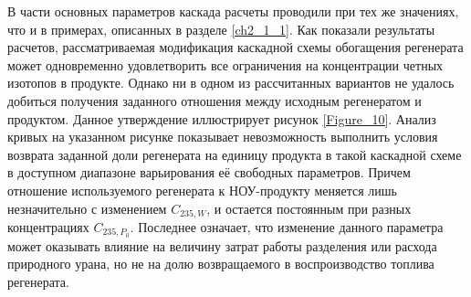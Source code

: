 В части основных параметров каскада расчеты проводили при тех же значениях, что и в примерах, описанных в разделе \ref{ch2_1_1}. Как показали результаты расчетов, рассматриваемая модификация каскадной схемы обогащения регенерата может одновременно удовлетворить все ограничения на концентрации четных изотопов в продукте. Однако ни в одном из рассчитанных вариантов не удалось добиться получения заданного отношения между исходным регенератом и продуктом. Данное утверждение иллюстрирует рисунок \ref{Figure_10}. Анализ кривых на указанном рисунке показывает невозможность выполнить условия возврата заданной доли регенерата на единицу продукта в такой каскадной схеме в доступном диапазоне варьирования её свободных параметров. Причем отношение используемого регенерата к НОУ-продукту меняется лишь незначительно с изменением $C_{235, W}$, и остается постоянным при разных концентрациях $C_{235, P_0}$. Последнее означает, что изменение данного параметра может оказывать влияние на величину затрат работы разделения или расхода природного урана, но не на долю возвращаемого в воспроизводство топлива регенерата.





